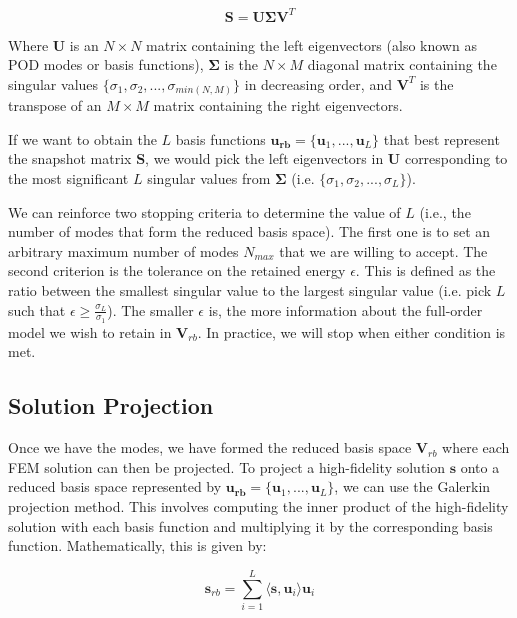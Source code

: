 \begin{equation}
    \mathbf{S} = \mathbf{U}\mathbf{\Sigma}\mathbf{V}^T
    \label{eqn:SVD}
\end{equation}

Where $\mathbf{U}$ is an $N \times N$ matrix containing the left eigenvectors (also known as POD modes or basis functions), $\mathbf{\Sigma}$ is the $N \times M$ diagonal matrix containing the singular values $\{\sigma_1, \sigma_2,...,\sigma_{min(N,M)}\}$ in decreasing order, and $\mathbf{V}^T$ is the transpose of an $M \times M$ matrix containing the right eigenvectors.

If we want to obtain the $L$ basis functions $\mathbf{u_{rb}} = \{\mathbf{u}_1,...,\mathbf{u}_L\}$ that best represent the snapshot matrix $\mathbf{S}$, we would pick the left eigenvectors in $\mathbf{U}$ corresponding to the most significant $L$ singular values from $\mathbf{\Sigma}$ (i.e. $\{\sigma_1, \sigma_2,...,\sigma_{L}\}$). 

We can reinforce two stopping criteria to determine the value of $L$ (i.e., the number of modes that form the reduced basis space). The first one is to set an arbitrary maximum number of modes $N_{max}$ that we are willing to accept. The second criterion is the tolerance on the retained energy $\epsilon$. This is defined as the ratio between the smallest singular value to the largest singular value (i.e. pick $L$ such that $\epsilon \geq \frac{\sigma_{L}}{\sigma_1}$). The smaller $\epsilon$ is, the more information about the full-order model we wish to retain in $\mathbf{V}_{rb}$. In practice, we will stop when either condition is met.

\subsection{Solution Projection}
Once we have the modes, we have formed the reduced basis space $\mathbf{V}_{rb}$ where each FEM solution can then be projected. To project a high-fidelity solution $\mathbf{s}$ onto a reduced basis space represented by $\mathbf{u_{rb}} = \{\mathbf{u}_1,...,\mathbf{u}_L\}$, we can use the Galerkin projection method. This involves computing the inner product of the high-fidelity solution with each basis function and multiplying it by the corresponding basis function. Mathematically, this is given by: 

\begin{equation*}
    \mathbf{s}_{rb} = \sum_{i=1}^{L} \langle \mathbf{s}, \mathbf{u}_i \rangle  \mathbf{u}_i
\end{equation*}

